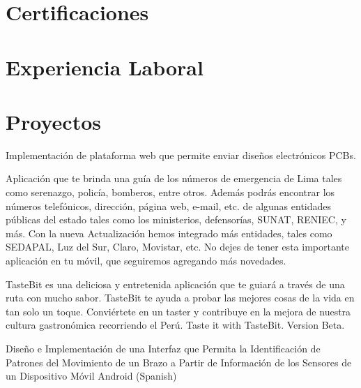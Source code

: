 \documentclass[11pt,a4paper,sans]{moderncv}
\begin{document}
\section{Certificaciones}
{} 

{}  

{}  



\section{Experiencia Laboral}
{} 

{}  



\section{Proyectos}
{Implementación de plataforma web que permite enviar diseños electrónicos PCBs.}  

{Aplicación que te brinda una guía de los números de emergencia de Lima tales como serenazgo, policía, bomberos, entre otros.
Además podrás encontrar los números telefónicos, dirección, página web, e-mail, etc. de algunas entidades públicas del estado tales como los ministerios, defensorías, SUNAT, RENIEC, y más.
Con la nueva Actualización hemos integrado más entidades, tales como SEDAPAL, Luz del Sur, Claro, Movistar, etc.
No dejes de tener esta importante aplicación en tu móvil, que seguiremos agregando más novedades.}  

{TasteBit es una deliciosa y entretenida aplicación que te guiará a través de una ruta con mucho sabor. 
TasteBit te ayuda  a probar las mejores cosas de la vida en tan solo un toque. 
Conviértete en un taster y contribuye en la mejora de nuestra cultura gastronómica recorriendo el Perú.
Taste it with TasteBit.
Version Beta.}  

{Diseño e Implementación de una Interfaz que Permita la Identificación de Patrones del Movimiento de un Brazo a Partir de Información de los Sensores de un Dispositivo Móvil Android (Spanish)}  
\end{document}
